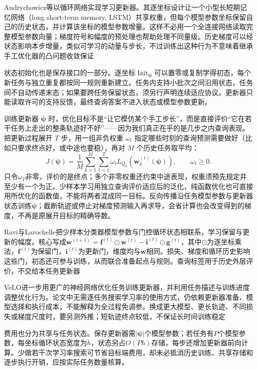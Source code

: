 Andrychowicz等以循环网络实现学习更新器。其逐坐标设计让一个小型长短期记忆网络（long short-term memory, LSTM）共享权重，但每个模型参数坐标保留自己的历史状态，并计算该坐标的模型参数增量。这样不必用一个全连接网络读取完整模型参数向量；梯度符号和幅度的预处理也帮助处理不同量级。历史梯度可以经状态影响本步增量，类似可学习的动量与步长，不过训练出这种行为不意味着继承手工优化器的凸问题收敛保证

状态初始化也是保存接口的一部分。逐坐标$\operatorname{Init}_{\bm\psi}$可以置零或复制学得初态，每个新任务与独立重复都按同一规则重新建立。任务内支持小批次之间沿用状态，任务间不自动传递末态；如果要跨任务保留状态，须另行声明连续适应协议。更新器只能读取许可的支持反馈，最终查询答案不进入状态或模型参数更新。

训练更新器 $\bm\psi$ 时，优化目标不是“让它模仿某个手工步长”，而是直接评价“它在若干任务上走出的整条轨迹好不好”——因为我们真正在乎的是几步之内查询表现。把更新过程展开 $T$ 步，用一组非负权重 $\omega_t$ 指定哪些时刻的查询预测需要做好（比如只要求终点好，或中途也要稳），再对 $M$ 个历史任务取平均：
\begin{equation}
  J(\bm\psi)=\frac1M\sum_{k=1}^{M}
       \sum_{t=1}^{T}\omega_t L_{Q_k}(\bm w_k^{(t)}(\bm\psi)),
       \qquad \omega_t\geq0.
  \label{eq:ket-transfer-optimizer-objective}
\end{equation}
只令$\omega_T$非零，评价的是终点；多个非零权重还约束中途表现，权重须预先规定并至少有一个为正。少样本学习用独立查询评价适应后的泛化，纯函数优化也可直接用所优化的函数值，不能将两者混成同一目标。反向传播沿任务模型参数与更新器状态训练$\bm\psi$；截断轨迹或停止对梯度预测输入再求导，会省计算也会改变得到的梯度，不再是原展开目标的精确导数。

Ravi与Larochelle把少样本分类器模型参数与门控循环状态相联系，学习保留与更新的幅度。核心写成$\bm w^{(t+1)}=\bm f^{(t)}\odot\bm w^{(t)}-\bm i^{(t)}\odot\bm g^{(t)}$，其中$\odot$为逐坐标乘法，$\bm f^{(t)}$为保留门，$\bm i^{(t)}$为更新门，维度均与$\bm w$相同。损失、梯度和循环历史影响这些门，初态还可参与训练，从而联合准备起点与规则。查询标签用于历史外层评价，不交给本任务更新器

VeLO进一步用更广的神经网络优化任务训练更新器，并利用任务描述与训练进度调整优化行为。论文中无需逐任务搜索学习率的使用方式，仍依赖更新器准备、模型选择和执行成本，不能解释为全过程免调参。换成更大模型、更长轨迹、不同损失或梯度尺度时，要另测外推；短轨迹终点较低，不保证长时间训练稳定

费用也分为共享与任务状态。保存更新器需$|\bm\psi|$个模型参数；若任务有$P$个模型参数，每坐标循环状态宽度为$h$，状态另占$O(Ph)$存储，每步还增加更新器前向计算。少做若干次学习率搜索可节省目标端费用，却未必抵消历史训练、共享存储和逐步执行开销，应按实际任务数量核算。

